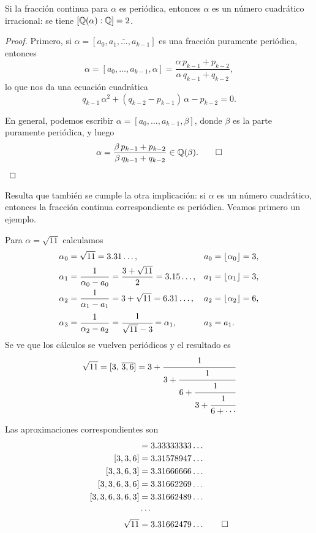 \begin{proposicion}
  \label{prop:fraccion-periodica=>cuadratico}
  Si la fracción continua para $\alpha$ es periódica, entonces $\alpha$ es un
  número cuadrático irracional: se tiene $[\mathbb{Q} (\alpha) : \mathbb{Q}] = 2$.

  \begin{proof}
    Primero, si $\alpha = [\overline{a_0,a_1,\ldots,a_{k-1}}]$ es una fracción
    puramente periódica, entonces
    $$\alpha = [a_0,\ldots,a_{k-1},\alpha] = \frac{\alpha\,p_{k-1} + p_{k-2}}{\alpha\,q_{k-1} + q_{k-2}},$$
    lo que nos da una ecuación cuadrática
    $$q_{k-1}\,\alpha^2 + (q_{k-2} - p_{k-1})\,\alpha - p_{k-2} = 0.$$

    En general, podemos escribir $\alpha = [a_0,\ldots,a_{k-1},\beta]$, donde
    $\beta$ es la parte puramente periódica, y luego
    \[ \alpha = \frac{\beta\,p_{k-1} + p_{k-2}}{\beta\,q_{k-1} + q_{k-2}} \in \mathbb{Q} (\beta). \qedhere \]
  \end{proof}
\end{proposicion}

Resulta que también se cumple la otra implicación: si $\alpha$ es un número
cuadrático, entonces la fracción continua correspondiente es periódica.
Veamos primero un ejemplo.

\begin{ejemplo}
  Para $\alpha = \sqrt{11}$ calculamos
  \begin{align*}
    \alpha_0 & = \sqrt{11} = 3.31\ldots, & a_0 & = \lfloor \alpha_0\rfloor = 3,\\
    \alpha_1 & = \frac{1}{\alpha_0 - a_0} = \frac{3 + \sqrt{11}}{2} = 3.15\ldots, & a_1 & = \lfloor \alpha_1\rfloor = 3,\\
    \alpha_2 & = \frac{1}{\alpha_1 - a_1} = 3 + \sqrt{11} = 6.31\ldots, & a_2 & = \lfloor \alpha_2\rfloor = 6,\\
    \alpha_3 & = \frac{1}{\alpha_2 - a_2} = \cfrac{1}{\sqrt{11} - 3} = \alpha_1, & a_3 & = a_1.
  \end{align*}
  Se ve que los cálculos se vuelven periódicos y el resultado es
  $$\sqrt{11} = [3, \, \overline{3,6}] = 3 + \cfrac{1}{3 + \cfrac{1}{6 + \cfrac{1}{3 + \cfrac{1}{6 + \cdots}}}}$$

  Las aproximaciones correspondientes son
  \begin{align*}
              [3,3] & = 3.33333333\ldots\\
            [3,3,6] & = 3.31578947\ldots\\
          [3,3,6,3] & = 3.31666666\ldots\\
        [3,3,6,3,6] & = 3.31662269\ldots\\
      [3,3,6,3,6,3] & = 3.31662489\ldots\\
                    & \cdots \\  
          \sqrt{11} & = 3.31662479\ldots \qedhere
  \end{align*}
\end{ejemplo}

